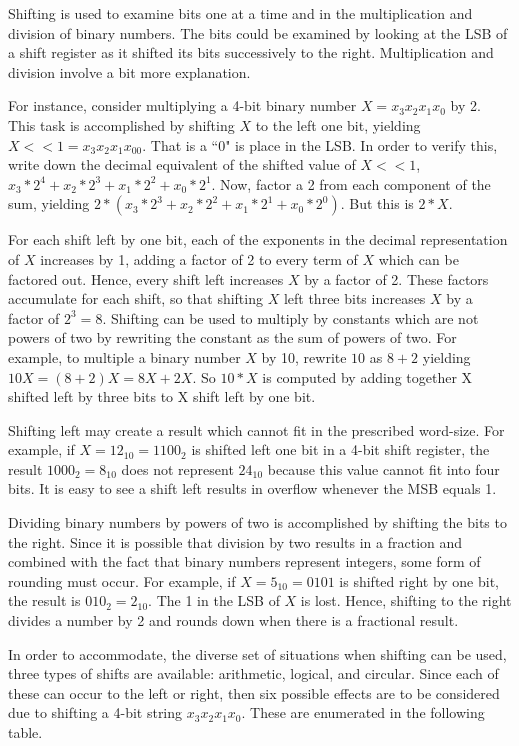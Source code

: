 Shifting is used to examine bits one at a time and in the 
multiplication and division of binary numbers.  The bits 
could be examined by looking at the LSB of a shift register 
as it shifted its bits successively to the right.  
Multiplication and division involve a bit more explanation.

For instance, consider multiplying a 4-bit binary number 
$X=x_3 x_2 x_1 x_0$  by 2.  This task is accomplished by shifting 
$X$ to the left one bit, yielding $X<<1=x_3 x_2 x_1 x_00$.  That
is a ``0" is place in the LSB.
In order to verify this, write down the decimal equivalent of 
the shifted value of $X<<1$, $x_3*2^4 +x_2*2^3 +x_1*2^2 +x_0*2^1$.  
Now, factor a 2 from each component of the sum, yielding
$2*(x_3*2^3 +x_2*2^2 +x_1*2^1 +x_0*2^0)$.  But this is $2*X$.  

For each shift left by one bit, each of the exponents in the 
decimal representation of $X$ increases by 1, adding a factor of 
2 to every term of $X$ which can be factored out.  Hence, every 
shift left increases $X$ by a factor of 2.  These factors 
accumulate for each shift, so that shifting $X$ left three bits 
increases $X$ by a factor of $2^3=8$.  Shifting can be used to 
multiply by constants which are not powers of two by rewriting the 
constant as the sum of powers of two.  For example, \label{page:MulyBy10} 
to multiple a binary number $X$ by 10, rewrite $10$ 
as $8+2$ yielding $10X = (8+2)X = 8X+2X$.  So $10*X$ is computed
by adding together X shifted left by three bits to X shift left by one bit.

Shifting left may create a result
which cannot fit in the prescribed word-size.  For example, if
$X=12_{10}=1100_2$ is shifted left one bit in a 4-bit shift register,
the result $1000_2 = 8_{10}$ does not represent $24_{10}$ because
this value cannot fit into four bits.  It is easy to see a shift left
results in overflow whenever the MSB equals 1.

Dividing binary numbers by powers of two is accomplished by
shifting the bits to the right.  Since it is possible that division by
two results in a fraction and combined with the fact that binary numbers
represent integers, some form of rounding must occur.  For example, 
if $X=5_{10}=0101$ is shifted right by one bit, the result is
$010_2=2_{10}$.  The 1 in the LSB of $X$ is lost.  Hence, shifting
to the right divides a number by 2 and rounds down when there
is a fractional result.

In order to accommodate, the diverse set of situations
when shifting can be used, three types of shifts are available: 
arithmetic, logical, and circular.  Since each of these can
occur to the left or right, then six possible effects are to be considered due to
shifting a 4-bit string $x_3 x_2 x_1 x_0$.  These are enumerated
in the following table.

